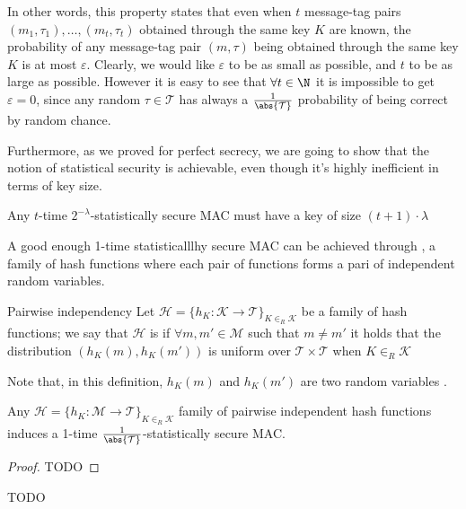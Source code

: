 \documentclass[a4paper, 12pt]{report}
\begin{document}
In other words, this property states that even when $t$ message-tag pairs $(m_1, \tau_1), \ldots, (m_t, \tau_t)$ obtained through the same key $K$ are known, the probability of any message-tag pair $(m, \tau)$ being obtained through the same key $K$ is at most $\varepsilon$. Clearly, we would like $\varepsilon$ to be as small as possible, and $t$ to be as large as possible. However it is easy to see that $\forall t \in \N$ it is impossible to get $\varepsilon = 0$, since any random $\tau \in \mathcal T$ has always a $\tfrac{1}{\abs {\mathcal T}}$ probability of being correct by random chance.

Furthermore, as we proved for perfect secrecy, we are going to show that the notion of  statistical security is achievable, even though it's highly inefficient in terms of key size.

\begin{framedthm}{}
	Any $t$-time $2^{-\lambda}$-statistically secure MAC must have a key of size $(t + 1) \cdot \lambda$
\end{framedthm}

A good enough 1-time statisticalllhy secure MAC can be achieved through , a family of hash functions where each pair of functions forms a pari of independent random variables.

\begin{frameddefn}{Pairwise independency}
	Let $\mathcal H = \{h_K : \mathcal K \to \mathcal T\}_{K \in_R \mathcal K}$ be a family of hash functions; we say that $\mathcal H$ is  if $\forall m, m' \in \mathcal M$ such that $m \neq m'$ it holds that the distribution $(h_K(m), h_K(m'))$ is uniform over $\mathcal T \times \mathcal T$ when $K \in_R \mathcal K$
\end{frameddefn}

Note that, in this definition, $h_K(m)$ and $h_K(m')$ are two random variables .

\begin{framedthm}{}
	Any $\mathcal H = \{h_K : \mathcal M \to \mathcal T\}_{K \in_R \mathcal K}$ family of pairwise independent hash functions induces a 1-time $\tfrac{1}{\abs {\mathcal T}}$-statistically secure MAC.
\end{framedthm}

\begin{proof}
	TODO 
\end{proof}

TODO 
\end{document}
